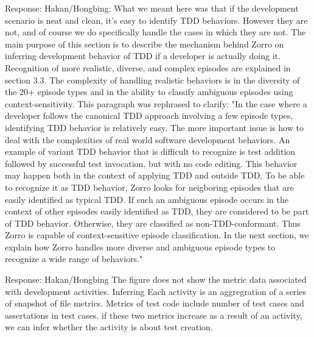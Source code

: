 \documentclass[11pt]{article}
\begin{document}

\noindent Response: Hakan/Hongbing: What we meant here was that if the development scenario is neat and clean, it's easy to identify TDD behaviors. However they are not, and of course we do specifically handle the cases in which they are not. The main purpose of this section is to describe the mechanism behind Zorro on inferring development behavior of TDD if a developer is actually doing it. Recognition of more realistic, diverse, and complex episodes are explained in section 3.3. The complexity of handling realistic behaviors is in the diversity of the 20+ episode types and in the ability to classify ambiguous episodes using context-sensitivity. This paragraph was rephrased to clarify: "In the case where a developer follows the
canonical TDD approach involving a few episode types, identifying TDD behavior is relatively easy.  The more important issue is how to deal with the
complexities of real world software development behaviors.  An example of variant TDD behavior that is difficult to recognize is test addition followed by successful test invocation, but with no code editing. This behavior may happen both in the context of applying TDD and outside TDD. To be able to recognize it as TDD behavior, Zorro looks for neigboring episodes that are easily identified as typical TDD. If such an ambiguous episode occurs in the context of other episodes easily identified as TDD, they are considered to be part of TDD behavior. Otherwise, they are classified as non-TDD-conformant. Thus Zorro is capable of context-sensitive episode classification. In the next section, we explain how Zorro
handles more diverse and ambiguous episode types to recognize a wide range of behaviors."



\noindent Response: Hakan/Hongbing The figure does not show the metric data associated with development activities. Inferring Each activity is an aggregration of a series of snapshot of file metrics. Metrics of test code include number of test cases and assertations in test cases. if these two metrics increase as a result of an activity, we can infer whether the activity is about test creation. 
\end{document}
